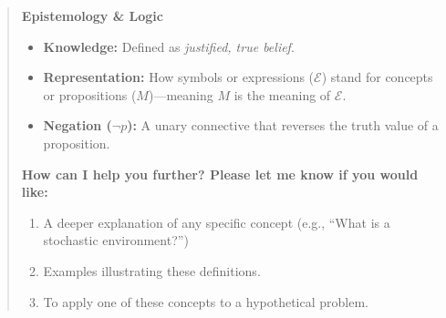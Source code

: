\begin{quote}
\medskip

\noindent\textbf{Epistemology \& Logic}
\begin{itemize}
    \item \textbf{Knowledge:} Defined as \emph{justified, true belief}.
    \item \textbf{Representation:} How symbols or expressions ($\mathcal{E}$) stand for concepts or propositions ($M$)---meaning $M$ is the meaning of $\mathcal{E}$.
    \item \textbf{Negation ($\neg p$):} A unary connective that reverses the truth value of a proposition.
\end{itemize}

\medskip

\noindent\textbf{How can I help you further? Please let me know if you would like:}

\begin{enumerate}
    \item A deeper explanation of any specific concept (e.g., ``What is a stochastic environment?'')
    \item Examples illustrating these definitions.
    \item To apply one of these concepts to a hypothetical problem.
\end{enumerate}


\end{quote}